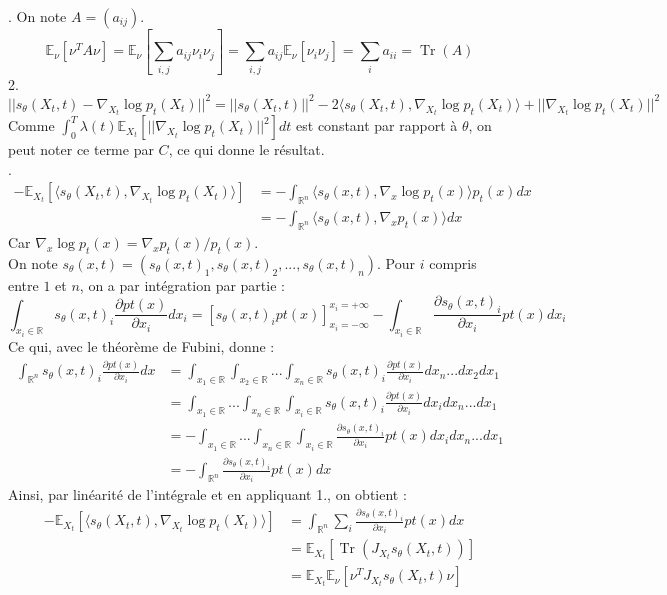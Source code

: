 \documentclass[a4paper, 12pt,french]{report}
\DeclareMathOperator{\Tr}{Tr}
\begin{document}
. On note $A=(a_{ij})$. \\
$$\mathbb{E}_\nu[\nu^TA\nu]
=\mathbb{E}_\nu[\sum_{i,j}a_{ij}\nu_i\nu_j]
=\sum_{i,j}a_{ij}\mathbb{E}_\nu[\nu_i\nu_j]
=\sum_ia_{ii}
=\Tr(A)$$
2. 
$$||s_\theta(X_t,t)-\nabla_{X_t}\log p_t(X_t)||^2=||s_\theta(X_t,t)||^2
-2\langle s_\theta(X_t,t), \nabla_{X_t}\log p_t(X_t) \rangle
+||\nabla_{X_t}\log p_t(X_t)||^2$$
Comme $\int_0^T\lambda(t)\mathbb{E}_{X_t}[||\nabla_{X_t}\log p_t(X_t)||^2]dt$ est constant par rapport à $\theta$, on peut noter ce terme par $C$, ce qui donne le résultat. \\
.
\begin{align*}
-\mathbb{E}_{X_t}[\langle s_\theta(X_t,t), \nabla_{X_t}\log p_t(X_t) \rangle] &
=-\int_{\mathbb{R}^n}\langle s_\theta(x,t), \nabla_{x}\log p_t(x) \rangle p_t(x)dx \\
& = -\int_{\mathbb{R}^n}\langle s_\theta(x,t), \nabla_{x} p_t(x) \rangle dx
\end{align*}
Car $\nabla_{x}\log p_t(x)=\nabla_{x}p_t(x) / p_t(x)$. \\
On note $s_\theta(x,t)=(s_\theta(x,t)_1,s_\theta(x,t)_2,...,s_\theta(x,t)_n)$.
Pour $i$ compris entre $1$ et $n$, on a par intégration par partie : 
$$\int_{x_i \in \mathbb{R}}s_\theta(x,t)_i\frac{\partial pt(x)}{\partial x_i}dx_i=
[s_\theta(x,t)_ipt(x)]_{x_i=-\infty}^{x_i=+\infty}
-\int_{x_i \in \mathbb{R}}\frac{\partial s_\theta(x,t)_i}{\partial x_i}pt(x)dx_i$$
Ce qui, avec le théorème de Fubini, donne : 
\begin{align*}
\int_{\mathbb{R}^n}s_\theta(x,t)_i\frac{\partial pt(x)}{\partial x_i}dx & =
\int_{x_1 \in \mathbb{R}}\int_{x_2 \in \mathbb{R}}...\int_{x_n \in \mathbb{R}}s_\theta(x,t)_i\frac{\partial pt(x)}{\partial x_i}dx_n...dx_2dx_1 \\
& = \int_{x_1 \in \mathbb{R}}...\int_{x_n \in \mathbb{R}}\int_{x_i \in \mathbb{R}}s_\theta(x,t)_i\frac{\partial pt(x)}{\partial x_i}dx_idx_n...dx_1 \\
& = -\int_{x_1 \in \mathbb{R}}...\int_{x_n \in \mathbb{R}}\int_{x_i \in \mathbb{R}}\frac{\partial s_\theta(x,t)_i}{\partial x_i}pt(x)dx_idx_n...dx_1 \\
& = -\int_{\mathbb{R}^n}\frac{\partial s_\theta(x,t)_i}{\partial x_i}pt(x)dx
\end{align*}
Ainsi, par linéarité de l'intégrale et en appliquant 1., on obtient : 
\begin{align*}
-\mathbb{E}_{X_t}[\langle s_\theta(X_t,t), \nabla_{X_t}\log p_t(X_t) \rangle] &=
\int_{\mathbb{R}^n}\sum_i\frac{\partial s_\theta(x,t)_i}{\partial x_i}pt(x)dx \\
&= \mathbb{E}_{X_t}[\Tr(J_{X_t}s_\theta(X_t,t))] \\
&= \mathbb{E}_{X_t}\mathbb{E}_\nu[\nu^TJ_{X_t}s_\theta(X_t,t)\nu]
\end{align*}
\end{document}
